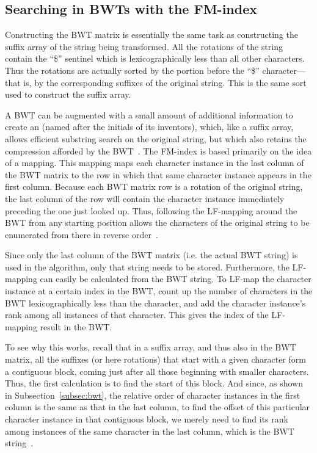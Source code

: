\subsection{Searching in BWTs with the FM-index}

Constructing the BWT matrix is essentially the same task as constructing the suffix array of the string being transformed. All the rotations of the string contain the ``\$'' sentinel which is lexicographically less than all other characters. Thus the rotations are actually sorted by the portion before the ``\$'' character---that is, by the corresponding suffixes of the original string. This is the same sort used to construct the suffix array.

A BWT can be augmented with a small amount of additional information to create an  (named after the initials of its inventors), which, like a suffix array, allows efficient substring search on the original string, but which also retains the compression afforded by the BWT~\cite{ferragina2000opportunistic}. The FM-index is based primarily on the idea of a  mapping. This mapping maps each character instance in the last column of the BWT matrix to the row in which that same character instance appears in the first column. Because each BWT matrix row is a rotation of the original string, the last column of the row will contain the character instance immediately preceding the one just looked up. Thus, following the LF-mapping around the BWT from any starting position allows the characters of the original string to be enumerated from there in reverse order~\cite{ferragina2000opportunistic}.

Since only the last column of the BWT matrix (i.e. the actual BWT string) is used in the algorithm, only that string needs to be stored. Furthermore, the LF-mapping can easily be calculated from the BWT string. To LF-map the character instance at a certain index in the BWT, count up the number of characters in the BWT lexicographically less than the character, and add the character instance's rank among all instances of that character. This gives the index of the LF-mapping result in the BWT.

To see why this works, recall that in a suffix array, and thus also in the BWT matrix, all the suffixes (or here rotations) that start with a given character form a contiguous block, coming just after all those beginning with smaller characters. Thus, the first calculation is to find the start of this block. And since, as shown in Subsection~\ref{subsec:bwt}, the relative order of character instances in the first column is the same as that in the last column, to find the offset of this particular character instance in that contiguous block, we merely need to find its rank among instances of the same character in the last column, which is the BWT string~\cite{langmead2013introduction}.

